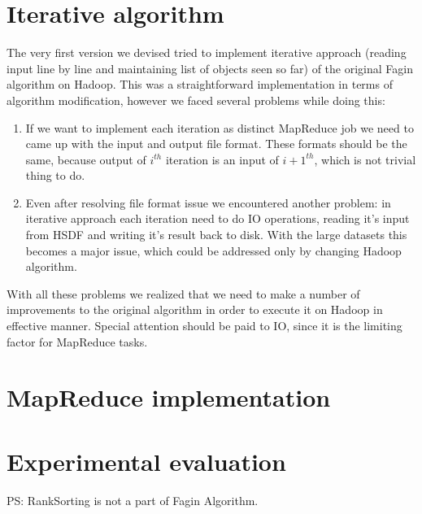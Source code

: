 \documentclass[a4paper]{article}
\begin{document}
\section{Iterative algorithm}
\label{sec:iterative}

The very first version we devised tried to implement iterative approach (reading input line by line and maintaining list of objects seen so far) of the original Fagin algorithm on Hadoop.
This was a straightforward implementation in terms of algorithm modification, however we faced several problems while doing this:
\begin{enumerate}
    \item If we want to implement each iteration as distinct MapReduce job we need to came up with the input and output file format.
    These formats should be the same, because output of $i^{th}$ iteration is an input of $i+1^{th}$, which is not trivial thing to do.
    \item Even after resolving file format issue we encountered another problem: in iterative approach each iteration need to do IO operations, reading it's input from HSDF and writing it's result back to disk.
    With the large datasets this becomes a major issue, which could be addressed only by changing Hadoop algorithm.
\end{enumerate}

With all these problems we realized that we need to make a number of improvements to the original algorithm in order to execute it on Hadoop in effective manner.
Special attention should be paid to IO, since it is the limiting factor for MapReduce tasks. 

\section{MapReduce implementation}
\label{sec:mapreduce}

\section{Experimental evaluation}
\label{sec:experiments}

PS: RankSorting is not a part of Fagin Algorithm.
\end{document}
